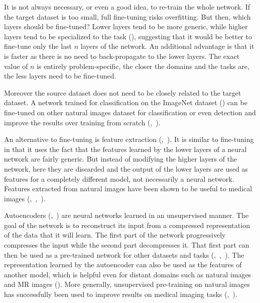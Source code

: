 It is not always necessary, or even a good idea, to re-train the whole network. If the target dataset is too small, full fine-tuning risks overfitting. But then, which layers should be fine-tuned? Lower layers tend to be more generic, while higher layers tend to be specialized to the task (\textcite{yosinski2014NIPS}), suggesting that it would be better to fine-tune only the last $n$ layers of the network. An additional advantage is that it is faster as there is no need to back-propagate to the lower layers. The exact value of $n$ is entirely problem-specific, the closer the domains and the tasks are, the less layers need to be fine-tuned.

Moreover the source dataset does not need to be closely related to the target dataset. A network trained for classification on the ImageNet dataset (\textcite{imagenet}) can be fine-tuned on other natural images dataset for classification or even detection and improve the results over training from scratch (\textcite{oquab2014CVPR},~\textcite{razavian2014CVPR}).

An alternative to fine-tuning is feature extraction (\textcite{donahue14PMLR},~\textcite{sermanet2014ICLR}). It is similar to fine-tuning in that it uses the fact that the features learned by the lower layers of a neural network are fairly generic. But instead of modifying the higher layers of the network, here they are discarded and the output of the lower layers are used as features for a completely different model, not necessarily a neural network. Features extracted from natural images have been shown to be useful to medical images (\textcite{shin2016},~\textcite{bar2015ISBI},~\textcite{vanginneken2015ISBI}).

Autoencoders (\textcite{ballard1987},~\textcite{bengio2007NIPS}) are neural networks learned in an unsupervised manner. The goal of the network is to reconstruct its input from a compressed representation of the data that it will learn. The first part of the network progressively compresses the input while the second part decompresses it. That first part can then be used as a pre-trained network for other datasets and tasks (\textcite{bengio2007NIPS},~\textcite{vincent2008ICML},~\textcite{erhan2010JMLR}). The representation learned by the autoencoder can also be used as the features of another model, which is helpful even for distant domains such as natural images and MR images (\textcite{gupta2013ICML}). More generally, unsupervised pre-training on natural images has successfully been used to improve results on medical imaging tasks (\textcite{schlegl2014MICCAI},~\textcite{hofmanninger2015CVPR}).

